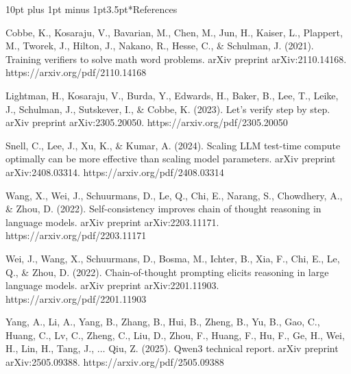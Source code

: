\documentclass[10pt,a4paper]{article}
\makeatletter
\renewcommand\section{\@startsection{section}{1}{\z@}%
  {10pt plus 1pt minus 1pt}{3.5pt}{\normalfont\large\bfseries}}
\makeatother
\begin{document}
\section*{References}
\begin{list}{}{%
\setlength{\leftmargin}{0.65cm}
\setlength{\itemindent}{-0.65cm}
\setlength{\itemsep}{2pt}
\setlength{\parsep}{0pt}
\footnotesize}
\item Cobbe, K., Kosaraju, V., Bavarian, M., Chen, M., Jun, H., Kaiser, L., Plappert, M., Tworek, J., Hilton, J., Nakano, R., Hesse, C., \& Schulman, J. (2021). Training verifiers to solve math word problems. arXiv preprint arXiv:2110.14168. https://arxiv.org/pdf/2110.14168
\item Lightman, H., Kosaraju, V., Burda, Y., Edwards, H., Baker, B., Lee, T., Leike, J., Schulman, J., Sutskever, I., \& Cobbe, K. (2023). Let’s verify step by step. arXiv preprint arXiv:2305.20050. https://arxiv.org/pdf/2305.20050
\item Snell, C., Lee, J., Xu, K., \& Kumar, A. (2024). Scaling LLM test-time compute optimally can be more effective than scaling model parameters. arXiv preprint arXiv:2408.03314. https://arxiv.org/pdf/2408.03314
\item Wang, X., Wei, J., Schuurmans, D., Le, Q., Chi, E., Narang, S., Chowdhery, A., \& Zhou, D. (2022). Self-consistency improves chain of thought reasoning in language models. arXiv preprint arXiv:2203.11171. https://arxiv.org/pdf/2203.11171
\item Wei, J., Wang, X., Schuurmans, D., Bosma, M., Ichter, B., Xia, F., Chi, E., Le, Q., \& Zhou, D. (2022). Chain-of-thought prompting elicits reasoning in large language models. arXiv preprint arXiv:2201.11903. https://arxiv.org/pdf/2201.11903
\item Yang, A., Li, A., Yang, B., Zhang, B., Hui, B., Zheng, B., Yu, B., Gao, C., Huang, C., Lv, C., Zheng, C., Liu, D., Zhou, F., Huang, F., Hu, F., Ge, H., Wei, H., Lin, H., Tang, J., $\ldots$ Qiu, Z. (2025). Qwen3 technical report. arXiv preprint arXiv:2505.09388. https://arxiv.org/pdf/2505.09388
\end{list}
\end{document}
